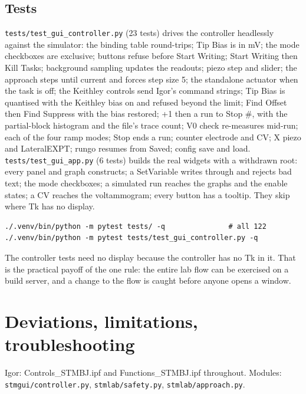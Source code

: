 \section{Tests}

\texttt{tests/\discretionary{}{}{}test\_\discretionary{}{}{}gui\_\discretionary{}{}{}controller.\discretionary{}{}{}py} (23 tests) drives the controller headlessly against the simulator: the binding table round-trips; Tip Bias is in mV; the mode checkboxes are exclusive; buttons refuse before Start Writing; Start Writing then Kill Tasks; background sampling updates the readouts; piezo step and slider; the approach steps until current and forces step size 5; the standalone actuator when the task is off; the Keithley controls send Igor's command strings; Tip Bias is quantised with the Keithley bias on and refused beyond the limit; Find Offset then Find Suppress with the bias restored; +1 then a run to Stop \#, with the partial-block histogram and the file's trace count; V0 check re-measures mid-run; each of the four ramp modes; Stop ends a run; counter electrode and CV; X piezo and LateralEXPT; rungo resumes from Saved; config save and load. \texttt{tests/\discretionary{}{}{}test\_\discretionary{}{}{}gui\_\discretionary{}{}{}app.\discretionary{}{}{}py} (6 tests) builds the real widgets with a withdrawn root: every panel and graph constructs; a SetVariable writes through and rejects bad text; the mode checkboxes; a simulated run reaches the graphs and the enable states; a CV reaches the voltammogram; every button has a tooltip. They skip where Tk has no display.

\begin{lstlisting}[style=out]
./.venv/bin/python -m pytest tests/ -q               # all 122
./.venv/bin/python -m pytest tests/test_gui_controller.py -q
\end{lstlisting}

The controller tests need no display because the controller has no Tk in it. That is the practical payoff of the one rule: the entire lab flow can be exercised on a build server, and a change to the flow is caught before anyone opens a window.

\setcounter{chapter}{48}
\chapter{Deviations, limitations, troubleshooting}

\begin{keybox}\small Igor: Controls\_STMBJ.ipf and Functions\_STMBJ.ipf throughout. Modules: \texttt{stmgui/\discretionary{}{}{}controller.\discretionary{}{}{}py}, \texttt{stmlab/\discretionary{}{}{}safety.\discretionary{}{}{}py}, \texttt{stmlab/\discretionary{}{}{}approach.\discretionary{}{}{}py}.\end{keybox}

